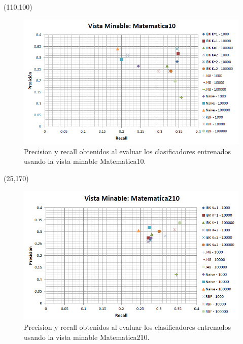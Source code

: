 \documentclass{article}
\begin{document}
\begin{textblock}{80}(110,100)
\begin{figure}[!htb]
\begin{centering}
\includegraphics[scale=0.4]{matematica10}
\par\end{centering}
\caption{Precision y recall obtenidos al evaluar los clasificadores entrenados usando la vista minable Matematica10.}
\label{fig:figura8}
\end{figure}
\end{textblock}

\begin{textblock}{80}(25,170)
\begin{figure}[!htb]
\begin{centering}
\includegraphics[scale=0.4]{matematica210}
\par\end{centering}
\caption{Precision y recall obtenidos al evaluar los clasificadores entrenados usando la vista minable Matematica210.}
\label{fig:figura9}
\end{figure}
\end{textblock}
\end{document}
